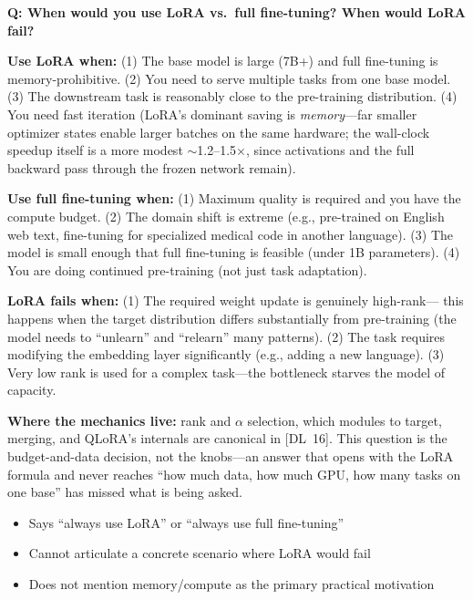 \begin{interviewq}
\textbf{Q: When would you use LoRA vs.\ full fine-tuning? When would LoRA fail?}

 \quad {} \quad \badgefreq{\freqhigh}

\stronganswer
\textbf{Use LoRA when:} (1) The base model is large (7B+) and full fine-tuning
is memory-prohibitive. (2) You need to serve multiple tasks from one base model.
(3) The downstream task is reasonably close to the pre-training distribution.
(4) You need fast iteration (LoRA's dominant saving is \emph{memory}---far
smaller optimizer states enable larger batches on the same hardware; the
wall-clock speedup itself is a more modest $\sim$1.2--1.5$\times$, since
activations and the full backward pass through the frozen network remain).

\textbf{Use full fine-tuning when:} (1) Maximum quality is required and you have
the compute budget. (2) The domain shift is extreme (e.g., pre-trained on English
web text, fine-tuning for specialized medical code in another language). (3) The
model is small enough that full fine-tuning is feasible (under 1B parameters).
(4) You are doing continued pre-training (not just task adaptation).

\textbf{LoRA fails when:} (1) The required weight update is genuinely high-rank---
this happens when the target distribution differs substantially from pre-training
(the model needs to ``unlearn'' and ``relearn'' many patterns). (2) The task requires
modifying the embedding layer significantly (e.g., adding a new language). (3) Very
low rank is used for a complex task---the bottleneck starves the model of capacity.

\textbf{Where the mechanics live:} rank and $\alpha$ selection, which modules to
target, merging, and QLoRA's internals are canonical in [DL~16].  This question
is the budget-and-data decision, not the knobs---an answer that opens with the
LoRA formula and never reaches ``how much data, how much GPU, how many tasks on
one base'' has missed what is being asked.

\redflags
\begin{itemize}
    \item Says ``always use LoRA'' or ``always use full fine-tuning''
    \item Cannot articulate a concrete scenario where LoRA would fail
    \item Does not mention memory/compute as the primary practical motivation
\end{itemize}


\end{interviewq}
